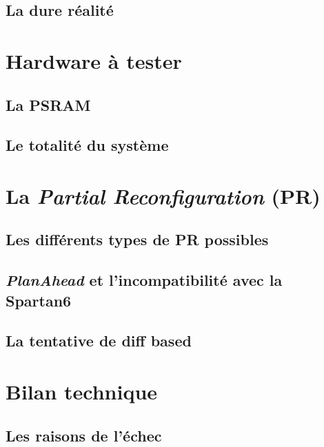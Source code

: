 \documentclass[a4paper]{report}
\begin{document}
\subsection{La dure réalité}
 \newpage

\section{Hardware à tester}

\subsection{La PSRAM}
 \newpage

\subsection{Le totalité du système}
 \newpage

\section{La \textit{Partial Reconfiguration} (PR)}

\subsection{Les différents types de PR possibles}
 \newpage

\subsection{\textit{PlanAhead} et l'incompatibilité avec la Spartan6}
 \newpage

\subsection{La tentative de diff based}
 \newpage

\section{Bilan technique}

\subsection{Les raisons de l'échec}
 \newpage
\end{document}
